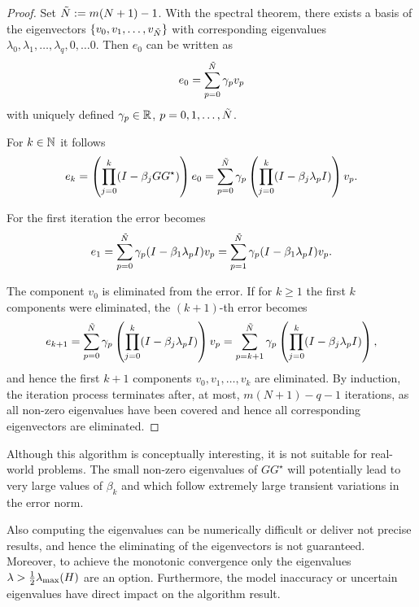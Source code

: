 \begin{proof} 
	Set $\tilde{N} := m(N+1) - 1$. With the spectral theorem, there exists a basis of the eigenvectors $\{v_0, v_1, \dots, v_{\tilde{N}}\}$ with corresponding eigenvalues $\lambda_0, \lambda_1, \dots, \lambda_q, 0, \dots 0$. 
	Then $e_0$ can be written as 
	\begin{align}
	e_0 = \sum_{p = 0}^{\tilde{N}} \gamma_p v_p
	\end{align}
	with uniquely defined $\gamma_p \in {\mathbb{R}}$, $p = 0, 1, \dots, \tilde{N}$. 
	
	For $k \in {\mathbb{N}}$ it follows 
	\begin{align}
	e_k = \left(\prod_{j=0}^k(I - \beta_j G G^\star)\right)e_0 = \sum_{p = 0}^{\tilde{N}} \gamma_p \left(\prod_{j=0}^k (I - \beta_j \lambda_p I)\right)v_p.
	\end{align}
	
	For the first iteration the error becomes 
	\begin{align}
	e_1 = \sum_{p = 0}^{\tilde{N}} \gamma_p ( I - \beta_1 \lambda_p I) v_p = \sum_{p=1}^{\tilde{N} } \gamma_p ( I - \beta_1 \lambda_p I) v_p.
	\end{align}
	
	The component $v_0$ is eliminated from the error.
	If for $k \geq 1$ the first $k$ components were eliminated, the $(k+1)$-th error becomes 
	\begin{align}
	e_{k+1} = \sum_{p = 0}^{\tilde{N}} \gamma_p \left(\prod_{j=0}^k (I - \beta_j \lambda_p I)\right)v_p = \sum_{p = k + 1}^{\tilde{N}} \gamma_p \left(\prod_{j = 0}^k (I - \beta_j \lambda_p I )\right),
	\end{align}
	and hence the first $k+1$ components $v_0, v_1, \dots, v_k$ are eliminated. 
	By induction, the iteration process terminates after, at most,  $m(N+1) - q - 1$ iterations, as all non-zero eigenvalues have been covered and hence all corresponding eigenvectors are eliminated.
		
\end{proof}

Although this algorithm is conceptually interesting, it is not suitable for real-world problems.
The small non-zero eigenvalues of $GG^\star$ will potentially lead to very large values of $\beta_k$ and which follow extremely large transient variations in the error norm. 

Also computing the eigenvalues can be numerically difficult or deliver not precise results, and hence the eliminating of the eigenvectors is not guaranteed. Moreover, to achieve the monotonic convergence only the eigenvalues $\lambda > \frac{1}{2}\lambda_{\mathrm{max}}(H)$ are an option.
Furthermore, the model inaccuracy or uncertain eigenvalues have direct impact on the algorithm result. 


